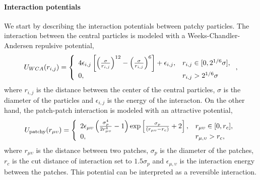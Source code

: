 \paragraph{Interaction potentials} We start by describing the interaction potentials between patchy particles.
The interaction between the central particles is modeled with a Weeks-Chandler-Andersen repulsive potential,
\begin{gather}
    U_{WCA}(r_{i,j}) =\left\{ 
        \begin{array}{ll}
            4\epsilon_{i,j}\left[\qty(\frac{\sigma}{r_{i,j}})^{12}-\qty(\frac{\sigma}{r_{i,j}})^6\right]+\epsilon_{i,j}, & r_{i,j}\in[0,2^{1/6}\sigma], \\
            0, & r_{i,j}>2^{1/6}\sigma
        \end{array}
\right.
    ,\label{eqn:CL-MO_interaction}
\end{gather}
where $r_{i,j}$ is the distance between the center of the central particles, $\sigma$ is the diameter of the particles and $\epsilon_{i,j}$ is the energy of the interacton.
On the other hand, the patch-patch interaction is modeled with an attractive potential,
\begin{gather}
    U_{\mathrm{patchy}}\qty(r_{\mu\upsilon}) = \left\{
        \begin{array}{ll}
            2\epsilon_{\mu\upsilon}\left(\frac{\sigma_p^4}{2 r_{\mu\upsilon}^4}-1\right)\exp\left[\frac{\sigma_p}{\qty(r_{\mu\upsilon}-r_{c})}+2\right], & r_{\mu\upsilon}\in\qty[0,r_c], \\
            0, & r_{\mu,\upsilon}>r_c,
        \end{array}
            \right.\label{eqn:patch-patch_interaction}
\end{gather}
where $r_{\mu\upsilon}$ is the distance between two patches, $\sigma_p$ is the diameter of the patches, $r_c$ is the cut distance of interaction set to $1.5\sigma_p$ and $\epsilon_{\mu,\upsilon}$ is the interaction energy between the patches.
This potential can be interpreted as a reversible interaction.

